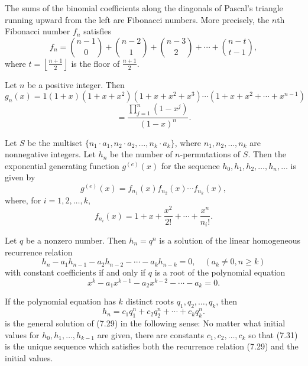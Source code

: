 \begin{theorem}
 \label{thm:7.1.2}
The sums of the binomial coefficients along the diagonals of Pascal's triangle running upward from the left are Fibonacci numbers. More precisely, the $n$th Fibonacci number $f_n$ satisfies
\[
f_n = \binom{n-1}{0} + \binom{n-2}{1} + \binom{n-3}{2} + \cdots + \binom{n-t}{t-1},
\]
where $t = \left\lfloor \frac{n+1}{2} \right\rfloor$ is the floor of $\frac{n+1}{2}$.
\end{theorem}

\begin{theorem}
  \label{thm:7.2.1}
Let $n$ be a positive integer. Then
\[
g_n(x) = 1(1 + x)(1 + x + x^2)(1 + x + x^2 + x^3) \cdots (1 + x + x^2 + \cdots + x^{n-1})
\]
\[
= \frac{\prod_{j=1}^n (1 - x^j)}{(1 - x)^n}.\tag{7.14}
\]
\end{theorem}

\begin{theorem}
\label{thm:7.3.1}
 Let $S$ be the multiset $\{n_1 \cdot a_1, n_2 \cdot a_2, \dots, n_k \cdot a_k\}$, where $n_1, n_2, \dots, n_k$ are nonnegative integers. Let $h_n$ be the number of $n$-permutations of $S$. Then the exponential generating function $g^{(e)}(x)$ for the sequence $h_0, h_1, h_2, \dots, h_n, \dots$ is given by
\[
    g^{(e)}(x) = f_{n_1}(x) f_{n_2}(x) \cdots f_{n_k}(x), \tag{7.18}
\]
where, for $i = 1, 2, \dots, k$,
\[
    f_{n_i}(x) = 1 + x + \frac{x^2}{2!} + \cdots + \frac{x^n}{{n_i}!}. 
\]
\end{theorem}



\begin{theorem}
  \label{thm:7.4.1}
Let $q$ be a nonzero number. Then $h_n = q^n$ is a solution of the linear homogeneous recurrence relation
\[
    h_n - a_1 h_{n-1} - a_2 h_{n-2} - \cdots - a_k h_{n-k} = 0, \quad (a_k \neq 0, n \geq k) \tag{7.29}
\]
with constant coefficients if and only if $q$ is a root of the polynomial equation
\[
    x^k - a_1 x^{k-1} - a_2 x^{k-2} - \cdots - a_k = 0. \tag{7.30}
\]

If the polynomial equation has $k$ distinct roots $q_1, q_2, \dots, q_k$, then
\[
h_n = c_1 q_1^n + c_2 q_2^n + \cdots + c_k q_k^n. \tag{7.31}
\]
is the general solution of (7.29) in the following sense: No matter what initial values for 
$h_0, h_1, \dots, h_{k-1}$ are given, there are constants $c_1, c_2, \dots, c_k$ so that (7.31) 
is the unique sequence which satisfies both the recurrence relation (7.29) and the initial values.


\end{theorem}


